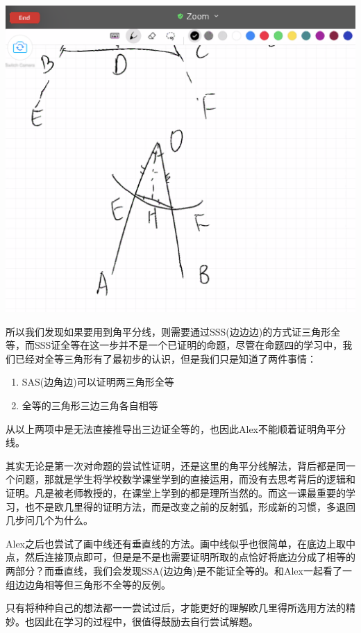 \documentclass[
]{book}
\providecommand{\tightlist}{%
  \setlength{\itemsep}{0pt}\setlength{\parskip}{0pt}}
\begin{document}
\includegraphics[width=1\linewidth]{./image/05-prop5-image7}

所以我们发现如果要用到角平分线，则需要通过SSS(边边边)的方式证三角形全等，而SSS证全等在这一步并不是一个已证明的命题，尽管在命题四的学习中，我们已经对全等三角形有了最初步的认识，但是我们只是知道了两件事情：

\begin{enumerate}
\def\labelenumi{\arabic{enumi}.}
\tightlist
\item
  SAS(边角边)可以证明两三角形全等
\item
  全等的三角形三边三角各自相等
\end{enumerate}

从以上两项中是无法直接推导出三边证全等的，也因此Alex不能顺着证明角平分线。

其实无论是第一次对命题的尝试性证明，还是这里的角平分线解法，背后都是同一个问题，那就是学生将学校数学课堂学到的直接运用，而没有去思考背后的逻辑和证明。凡是被老师教授的，在课堂上学到的都是理所当然的。而这一课最重要的学习，也不是欧几里得的证明方法，而是改变之前的反射弧，形成新的习惯，多退回几步问几个为什么。

Alex之后也尝试了画中线还有垂直线的方法。画中线似乎也很简单，在底边上取中点，然后连接顶点即可，但是是不是也需要证明所取的点恰好将底边分成了相等的两部分？而垂直线，我们会发现SSA(边边角)是不能证全等的。和Alex一起看了一组边边角相等但三角形不全等的反例。

只有将种种自己的想法都一一尝试过后，才能更好的理解欧几里得所选用方法的精妙。也因此在学习的过程中，很值得鼓励去自行尝试解题。
\end{document}
